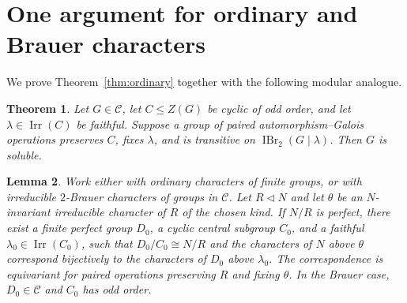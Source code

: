 \documentclass[11pt,a4paper]{amsart}
\DeclareMathOperator{\Irr}{Irr}
\DeclareMathOperator{\IBr}{IBr}
\newtheorem{theorem}{Theorem}[section]
\newtheorem{lemma}[theorem]{Lemma}
\theoremstyle{remark}
\numberwithin{equation}{section}
\begin{document}
\section{One argument for ordinary and Brauer characters}
\label{sec:character-transitivity}

We prove Theorem~\ref{thm:ordinary} together with the following
modular analogue.

\begin{theorem}\label{thm:modular-transitivity}
Let $G\in\mathcal C$, let $C\leq Z(G)$ be cyclic of odd order, and let
$\lambda\in\Irr(C)$ be faithful. Suppose a group of paired
automorphism--Galois operations preserves $C$, fixes $\lambda$, and is
transitive on $\IBr_2(G\mid\lambda)$. Then $G$ is soluble.
\end{theorem}

\begin{lemma}\label{lemma:character-cover}
Work either with ordinary characters of finite groups, or with irreducible
$2$-Brauer characters of groups in $\mathcal C$. Let $R\triangleleft N$
and let $\theta$ be an $N$-invariant irreducible character of $R$ of the
chosen kind. If $N/R$ is perfect, there exist a finite perfect group
$D_0$, a cyclic central subgroup $C_0$, and a faithful
$\lambda_0\in\Irr(C_0)$, such that $D_0/C_0\cong N/R$ and the
characters of $N$ above $\theta$ correspond bijectively to the characters
of $D_0$ above $\lambda_0$. The correspondence is equivariant for paired
operations preserving $R$ and fixing $\theta$. In the Brauer case,
$D_0\in\mathcal C$ and $C_0$ has odd order.
\end{lemma}
\end{document}
